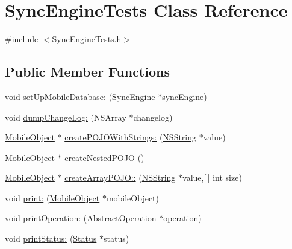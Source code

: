 \hypertarget{interface_sync_engine_tests}{
\section{\-Sync\-Engine\-Tests \-Class \-Reference}
\label{interface_sync_engine_tests}
}


{\ttfamily \#include $<$\-Sync\-Engine\-Tests.\-h$>$}

\subsection*{\-Public \-Member \-Functions}
\begin{DoxyCompactItemize}
\item 
void \hyperlink{interface_sync_engine_tests_a51a5682df4dec3f02eb3eabaa6e81407}{set\-Up\-Mobile\-Database\-:} (\hyperlink{interface_sync_engine}{\-Sync\-Engine} $\ast$sync\-Engine)
\item 
void \hyperlink{interface_sync_engine_tests_a8237074344a84665f875142288823625}{dump\-Change\-Log\-:} (\-N\-S\-Array $\ast$changelog)
\item 
\hyperlink{interface_mobile_object}{\-Mobile\-Object} $\ast$ \hyperlink{interface_sync_engine_tests_a9e7bb5e016f74b84d45363a75da700d4}{create\-P\-O\-J\-O\-With\-Strings\-:} (\hyperlink{class_n_s_string}{\-N\-S\-String} $\ast$value)
\item 
\hyperlink{interface_mobile_object}{\-Mobile\-Object} $\ast$ \hyperlink{interface_sync_engine_tests_addbea0a3f9285bea1e6d1fa3bae38564}{create\-Nested\-P\-O\-J\-O} ()
\item 
\hyperlink{interface_mobile_object}{\-Mobile\-Object} $\ast$ \hyperlink{interface_sync_engine_tests_acd5e4643a66dc9bdbc63f0fde8d03ee1}{create\-Array\-P\-O\-J\-O\-::} (\hyperlink{class_n_s_string}{\-N\-S\-String} $\ast$value,\mbox{[}$\,$\mbox{]} int size)
\item 
void \hyperlink{interface_sync_engine_tests_ab693d11baaf2046066d2c2f91dfaa34b}{print\-:} (\hyperlink{interface_mobile_object}{\-Mobile\-Object} $\ast$mobile\-Object)
\item 
void \hyperlink{interface_sync_engine_tests_a1eb3704d50c11b22dd21790c147452f9}{print\-Operation\-:} (\hyperlink{interface_abstract_operation}{\-Abstract\-Operation} $\ast$operation)
\item 
void \hyperlink{interface_sync_engine_tests_ac2504b96f5d427b2aaa1010c9e56fe38}{print\-Status\-:} (\hyperlink{interface_status}{\-Status} $\ast$status)
\end{DoxyCompactItemize}


